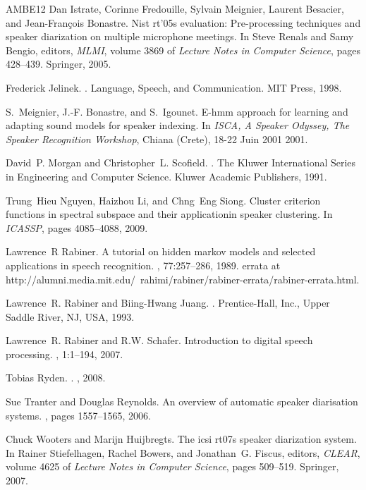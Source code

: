 \begin{thebibliography}{AMBE{\etalchar{+}}12}
Dan Istrate, Corinne Fredouille, Sylvain Meignier, Laurent Besacier, and
  Jean-François Bonastre.
\newblock Nist rt'05s evaluation: Pre-processing techniques and speaker
  diarization on multiple microphone meetings.
\newblock In Steve Renals and Samy Bengio, editors, {\em MLMI}, volume 3869 of
  {\em Lecture Notes in Computer Science}, pages 428--439. Springer, 2005.

Frederick Jelinek.
.
\newblock Language, Speech, and Communication. MIT Press, 1998.

S.~Meignier, J.-F. Bonastre, and S.~Igounet.
\newblock E-hmm approach for learning and adapting sound models for speaker
  indexing.
\newblock In {\em ISCA, A Speaker Odyssey, The Speaker Recognition Workshop},
  Chiana (Crete), 18-22 Juin 2001 2001.

David~P. Morgan and Christopher~L. Scofield.
.
\newblock The Kluwer International Series in Engineering and Computer Science.
  Kluwer Academic Publishers, 1991.

Trung~Hieu Nguyen, Haizhou Li, and Chng~Eng Siong.
\newblock Cluster criterion functions in spectral subspace and their
  applicationin speaker clustering.
\newblock In {\em ICASSP}, pages 4085--4088, 2009.

Lawrence~R Rabiner.
\newblock A tutorial on hidden markov models and selected applications in
  speech recognition.
, 77:257--286, 1989.
\newblock errata at
  http://alumni.media.mit.edu/~rahimi/rabiner/rabiner-errata/rabiner-errata.html.

Lawrence~R. Rabiner and Biing-Hwang Juang.
.
\newblock Prentice-Hall, Inc., Upper Saddle River, NJ, USA, 1993.

Lawrence~R. Rabiner and R.W. Schafer.
\newblock Introduction to digital speech processing.
, 1:1--194, 2007.

Tobias Ryden.
.
, 2008.

Sue Tranter and Douglas Reynolds.
\newblock An overview of automatic speaker diarisation systems.
, pages 1557--1565, 2006.

Chuck Wooters and Marijn Huijbregts.
\newblock The icsi rt07s speaker diarization system.
\newblock In Rainer Stiefelhagen, Rachel Bowers, and Jonathan~G. Fiscus,
  editors, {\em CLEAR}, volume 4625 of {\em Lecture Notes in Computer Science},
  pages 509--519. Springer, 2007.

\end{thebibliography}
